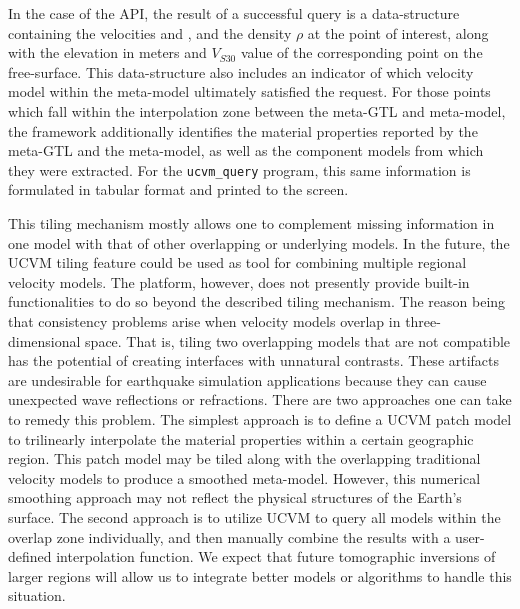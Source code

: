 In the case of the API, the result of a successful query is a data-structure containing the velocities \vp{} and \vs{}, and the density $\rho$ at the point of interest, along with the elevation in meters and $V_{S30}$ value of the corresponding point on the free-surface. This data-structure also includes an indicator of which velocity model within the meta-model ultimately satisfied the request. For those points which fall within the interpolation zone between the meta-GTL and meta-model, the framework additionally identifies the material properties reported by the meta-GTL and the meta-model, as well as the component models from which they were extracted. For the \texttt{ucvm\_query} program, this same information is formulated in tabular format and printed to the screen.

This tiling mechanism mostly allows one to complement missing information in one model with that of other overlapping or underlying models. In the future, the UCVM tiling feature could be used as tool for combining multiple regional velocity models. The platform, however, does not presently provide built-in functionalities to do so beyond the described tiling mechanism. The reason being that consistency problems arise when velocity models overlap in three-dimensional space. That is, tiling two overlapping models that are not compatible has the potential of creating interfaces with unnatural contrasts. These artifacts are undesirable for earthquake simulation applications because they can cause unexpected wave reflections or refractions. There are two approaches one can take to remedy this problem. The simplest approach is to define a UCVM patch model to trilinearly interpolate the material properties within a certain geographic region. This patch model may be tiled along with the overlapping traditional velocity models to produce a smoothed meta-model. However, this numerical smoothing approach may not reflect the physical structures of the Earth's surface. The second approach is to utilize UCVM to query all models within the overlap zone individually, and then manually combine the results with a user-defined interpolation function. We expect that future tomographic inversions of larger regions will allow us to integrate better models or algorithms to handle this situation.
